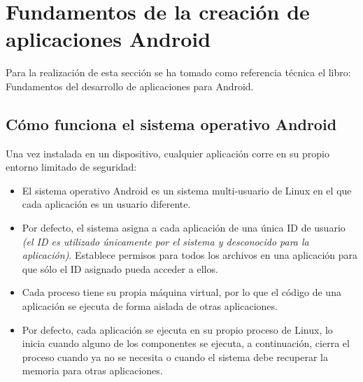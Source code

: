 \pagebreak


\section{Fundamentos de la creación de aplicaciones Android}

Para la realización de esta sección se ha tomado como referencia técnica el libro: Fundamentos del desarrollo de aplicaciones para Android. \cite{android} 

\subsection{Cómo funciona el sistema operativo Android}
Una vez instalada en un dispositivo, cualquier aplicación corre en su propio entorno limitado de seguridad\cite{android}: 
\begin{itemize}

	\item El sistema operativo Android es un sistema multi-usuario de Linux en el que cada aplicación es un usuario diferente.  

	\item Por defecto, el sistema asigna a cada aplicación de una única ID de usuario \textit{(el ID es utilizado únicamente por el sistema y desconocido para la aplicación)}. Establece permisos para todos los archivos en una aplicación para que sólo el ID asignado pueda acceder a ellos.  

	\item Cada proceso tiene su propia máquina virtual, por lo que el código de una aplicación se ejecuta de forma aislada de otras aplicaciones.  

	\item Por defecto, cada aplicación se ejecuta en su propio proceso de Linux, lo inicia cuando alguno de los componentes se ejecuta, a continuación, cierra el proceso cuando ya no se necesita o cuando el sistema debe recuperar la memoria para otras aplicaciones. 
\end{itemize}

